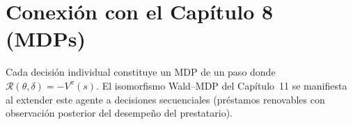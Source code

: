 \documentclass[11pt,a4paper]{article}
\theoremstyle{definition}
\newcommand{\Risk}{\mathcal{R}}
\begin{document}
\section*{Conexión con el Capítulo 8 (MDPs)}

Cada decisión individual constituye un MDP de un paso donde
$\Risk(\theta,\delta) = -V^\pi(s)$. El isomorfismo Wald--MDP del Capítulo~11
se manifiesta al extender este agente a decisiones secuenciales
(préstamos renovables con observación posterior del desempeño del prestatario).
\end{document}
